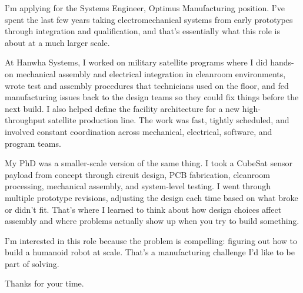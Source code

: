 \documentclass[letterpaper,11pt]{moderncv}
\date{\today}
\begin{document}
\makelettertitle

I'm applying for the Systems Engineer, Optimus Manufacturing position. I've spent the last few years taking electromechanical systems from early prototypes through integration and qualification, and that's essentially what this role is about at a much larger scale.

At Hanwha Systems, I worked on military satellite programs where I did hands-on mechanical assembly and electrical integration in cleanroom environments, wrote test and assembly procedures that technicians used on the floor, and fed manufacturing issues back to the design teams so they could fix things before the next build. I also helped define the facility architecture for a new high-throughput satellite production line. The work was fast, tightly scheduled, and involved constant coordination across mechanical, electrical, software, and program teams.

My PhD was a smaller-scale version of the same thing. I took a CubeSat sensor payload from concept through circuit design, PCB fabrication, cleanroom processing, mechanical assembly, and system-level testing. I went through multiple prototype revisions, adjusting the design each time based on what broke or didn't fit. That's where I learned to think about how design choices affect assembly and where problems actually show up when you try to build something.

I'm interested in this role because the problem is compelling: figuring out how to build a humanoid robot at scale. That's a manufacturing challenge I'd like to be part of solving.

Thanks for your time.

\makeletterclosing
\end{document}
